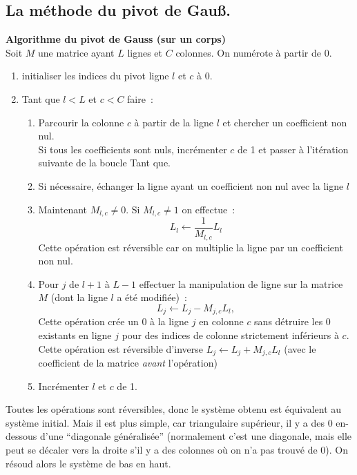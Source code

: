 \documentclass[a4paper,11pt]{book}
\begin{document}
\begin{giacjshere}
\subsection{La m\'ethode du pivot de Gau\ss.}
{\bf Algorithme du pivot de Gauss (sur un corps)}\\
Soit $M$ une matrice ayant $L$ lignes et $C$ colonnes. On num\'erote
\`a partir de 0.
\begin{enumerate}
\item initialiser les indices du pivot ligne $l$ et $c$ \`a 0.
\item Tant que $l<L$ et $c<C$ faire~:
\begin{enumerate}
\item Parcourir la colonne $c$ \`a partir de la ligne $l$ et chercher
  un coefficient non nul.\\
Si tous les coefficients sont nuls, incr\'ementer $c$ de 1 et passer
\`a l'it\'eration suivante de la boucle Tant que.
\item Si n\'ecessaire, \'echanger la ligne ayant un coefficient non nul
avec la ligne $l$
\item Maintenant $M_{l,c}\neq 0$. Si $M_{l,c} \neq 1$ on effectue~:
$$ L_l \leftarrow \frac{1}{M_{l,c}} L_l $$
Cette op\'eration est r\'eversible car on multiplie la ligne par un
coefficient non nul.
\item
Pour $j$ de $l+1$ \`a $L-1$ effectuer la manipulation de ligne sur la
matrice $M$ (dont la ligne $l$ a \'et\'e modifi\'ee)~:
$$ L_j \leftarrow L_j - M_{j,c} L_l, $$
Cette op\'eration cr\'ee un 0 \`a la ligne $j$ en colonne $c$
sans d\'etruire les 0 existants en ligne $j$ pour des indices de
colonne strictement inf\'erieurs \`a $c$.\\
Cette op\'eration est r\'eversible d'inverse 
$L_j \leftarrow L_j+M_{j,c} L_l $ (avec le coefficient de la matrice
{\em avant} l'op\'eration)
\item Incr\'ementer $l$ et $c$ de 1.
\end{enumerate}
\end{enumerate}
Toutes les op\'erations sont r\'eversibles, donc le syst\`eme obtenu est \'equivalent au
syst\`eme initial. Mais il est plus simple, car triangulaire
sup\'erieur, il y a des 0 en-dessous d'une ``diagonale
g\'en\'eralis\'ee'' (normalement c'est une diagonale, mais
elle peut se d\'ecaler vers la droite s'il y a des colonnes o\`u
on n'a pas trouv\'e de 0).
On r\'esoud alors le syst\`eme de bas en haut.


\end{giacjshere}
\end{document}
